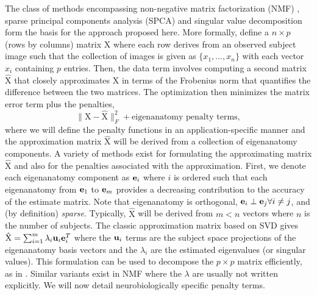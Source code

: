 \documentclass{elsarticle}\usepackage{graphicx, color}
\newcommand{\X}{\mathrm{X}}
\newcommand{\Xh}{\hat{\mathrm{X}}}
\begin{document}
The class of methods encompassing non-negative matrix factorization (NMF) \cite{Lee1999,sparseNMF_hoyer,sparseNMF_kim,sparseNMF_heiler}, sparse principal components analysis (SPCA) \cite{sparsePCA_zou,sparsePCA_jordan,sparsePCA_journee,Gandy2010,Chennubhotla2001,Lee2011} and singular value decomposition \cite{Sill2011,Lee2010b,Yeung2002} form the basis for the approach proposed here. More formally, define a $n \times p$ (rows by columns) matrix $\X$ where each row derives from an observed subject image such that the collection of images is given as $\{x_1,...,x_n\}$ with each vector $x_i$ containing $p$ entries.  Then, the data term involves computing a second matrix $\Xh$ that closely approximates $\X$ in terms of the Frobenius norm that quantifies the difference between the two matrices.   The optimization then minimizes the matrix error term plus the penalties, 
\begin{equation}
\label{spca}
\| \X - \Xh \|_F^2  +  \text{eigenanatomy penalty terms},
\end{equation}
where we will define the penalty functions in an application-specific manner and the approximation matrix $\Xh$ will be derived from a collection of eigenanatomy components.  A variety of methods exist for formulating the approximating matrix $\Xh$ and also for the penalties associated with the approximation.  First, we denote each eigenanatomy component as ${\bf e}_i$ where $i$ is ordered such that each eigenanatomy from ${\bf e}_1$ to ${\bf e}_m$ provides a decreasing contribution to the accuracy of the estimate matrix.  Note that eigenanatomy is orthogonal, ${\bf e}_i \perp {\bf e}_j  \forall i \ne j$, and (by definition) {\em sparse}.  Typically, $\Xh$ will be derived from $m < n$ vectors where $n$ is the number of subjects. 
The classic approximation matrix based on SVD gives  
$ \Xh =   \sum_{i=1}^m  \lambda_i  {\bf u}_i {\bf e}_i^T $
where the ${\bf u}_i$ terms are the subject space projections of the eigenanatomy basis vectors and the $\lambda_i$ are the estimated eigenvalues (or singular values).  This formulation can be used to decompose the $p \times p$ matrix efficiently, as in \cite{Witten2009b}.  Similar variants exist in NMF where the $\lambda$ are usually not written explicitly. We will now detail neurobiologically specific penalty terms.
\end{document}
